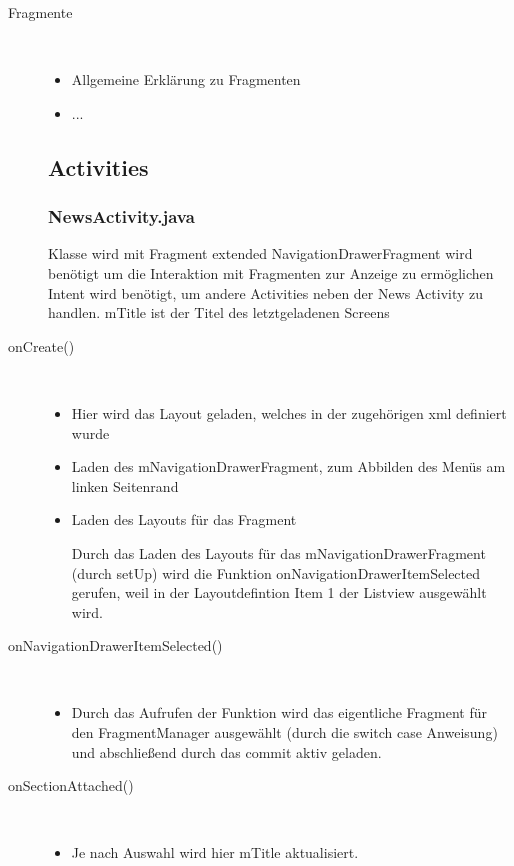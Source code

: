 \begin{description}
 
\item[Fragmente]~\par
\begin{itemize}
\item Allgemeine Erklärung  zu Fragmenten
\item ...
\end{itemize}


\subsection{Activities}
\subsubsection{NewsActivity.java}
Klasse wird mit Fragment extended
NavigationDrawerFragment wird benötigt um die Interaktion mit Fragmenten zur Anzeige zu ermöglichen
Intent wird benötigt, um andere Activities neben der News Activity zu handlen.
mTitle ist der Titel des letztgeladenen Screens
 
\item[onCreate()]~\par
\begin{itemize}
\item Hier wird das Layout geladen, welches in der zugehörigen xml definiert wurde
\item Laden des mNavigationDrawerFragment, zum Abbilden des Menüs am linken Seitenrand
\item Laden des Layouts für das Fragment
 
Durch das Laden des Layouts für das mNavigationDrawerFragment (durch setUp) wird die Funktion onNavigationDrawerItemSelected gerufen, weil in der Layoutdefintion Item 1 der Listview ausgewählt wird.
\end{itemize}
 
\item[onNavigationDrawerItemSelected()]~\par
\begin{itemize}
\item Durch das Aufrufen der Funktion wird das eigentliche Fragment für den FragmentManager ausgewählt (durch die switch case Anweisung) und abschließend durch das commit aktiv geladen.
\end{itemize}

 
\item[onSectionAttached()]~\par
\begin{itemize}
\item Je nach Auswahl wird hier mTitle aktualisiert.
\end{itemize}


\end{description}
